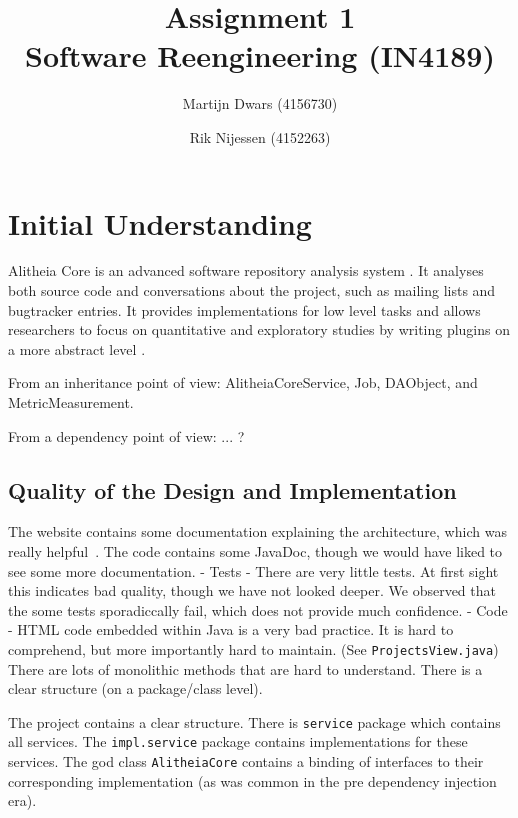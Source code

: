 \documentclass{article}
\author{Martijn Dwars (4156730) \and Rik Nijessen (4152263)}
\title{Assignment 1 \\ Software Reengineering (IN4189)}
\begin{document}
\maketitle

\section{Initial Understanding}
Alitheia Core is an advanced software repository analysis system \cite{sqooss-docs}. It analyses both source code and conversations about the project, such as mailing lists and bugtracker entries. It provides implementations for low level tasks and allows researchers to focus on quantitative and exploratory studies by writing plugins on a more abstract level \cite{sqooss-about}.

From an inheritance point of view: AlitheiaCoreService, Job, DAObject, and MetricMeasurement.

From a dependency point of view: ... ?



\subsection{Quality of the Design and Implementation}
The website contains some documentation explaining the architecture, which was really helpful~\cite{sqooss-reference}. The code contains some JavaDoc, though we would have liked to see some more documentation.
- Tests
 - There are very little tests. At first sight this indicates bad quality, though we have not looked deeper. We observed that the some tests sporadiccally fail, which does not provide much confidence.
- Code
 - HTML code embedded within Java is a very bad practice. It is hard to comprehend, but more importantly hard to maintain. (See \verb|ProjectsView.java|) There are lots of monolithic methods that are hard to understand. There is a clear structure (on a package/class level).

The project contains a clear structure. There is \verb|service| package which contains all services. The \verb|impl.service| package contains implementations for these services. The god class \verb|AlitheiaCore| contains a binding of interfaces to their corresponding implementation (as was common in the pre dependency injection era).
\end{document}
